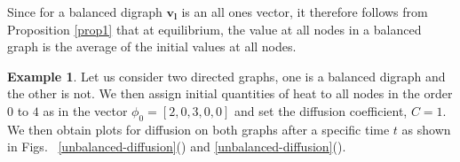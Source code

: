 \documentclass[10pt,a4paper]{article}
\theoremstyle{plain}
\theoremstyle{definition}
\newtheorem{exa}[subsection]{Example}
\begin{document}
      Since for a balanced digraph $\mathbf{v_l}$ is an all ones vector, it therefore follows from Proposition \ref{prop1} that at equilibrium, the value at all nodes in a balanced graph is the average of the initial values at all nodes. \\
      
      \begin{exa}
      	Let us consider two directed graphs, one is a balanced digraph and the other is not. We then assign initial quantities of heat to all nodes in the order $0$ to $4$ as in the vector $\phi_0=[2,0,3,0,0]$ and set the diffusion coefficient, $C=1$. We then obtain plots for diffusion on both graphs after a specific time $t$ as shown in Figs.~ \ref{unbalanced-diffusion}() and \ref{unbalanced-diffusion}().
      	

\end{exa}
\end{document}
